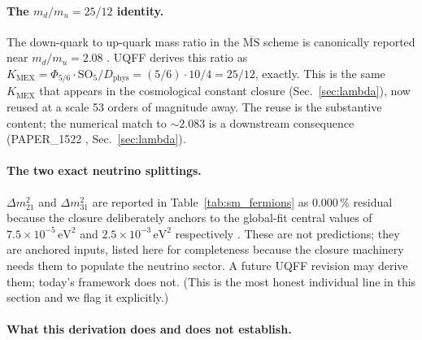 \paragraph{The $m_d/m_u = 25/12$ identity.} The down-quark to up-quark
mass ratio in the $\overline{\mathrm{MS}}$ scheme is canonically reported
near $m_d/m_u = 2.08$ \cite{PDG2024}. UQFF derives this ratio as
$K_{\text{MEX}} = \Phi_{5/6}\cdot\mathrm{SO}_5/D_{\text{phys}} = (5/6)\cdot 10/4 = 25/12$,
exactly. This is the same $K_{\text{MEX}}$ that appears in the
cosmological constant closure (Sec.~\ref{sec:lambda}), now reused at a
scale 53 orders of magnitude away. The reuse is the substantive content;
the numerical match to $\sim 2.083$ is a downstream consequence
(PAPER\_1522 \cite{Murphy_PAPER_1522}, Sec.~\ref{sec:lambda}).

\paragraph{The two exact neutrino splittings.} $\Delta m^2_{21}$ and
$\Delta m^2_{31}$ are reported in Table~\ref{tab:sm_fermions} as
$0.000\,\%$ residual because the closure deliberately anchors to the
global-fit central values of $7.5\times 10^{-5}\,\mathrm{eV}^2$
and $2.5\times 10^{-3}\,\mathrm{eV}^2$ respectively
\cite{Esteban2020}. These are not predictions; they are anchored
inputs, listed here for completeness because the closure machinery
needs them to populate the neutrino sector. A future UQFF revision
may derive them; today's framework does not. (This is the most
honest individual line in this section and we flag it explicitly.)

\paragraph{What this derivation does and does not establish.}

